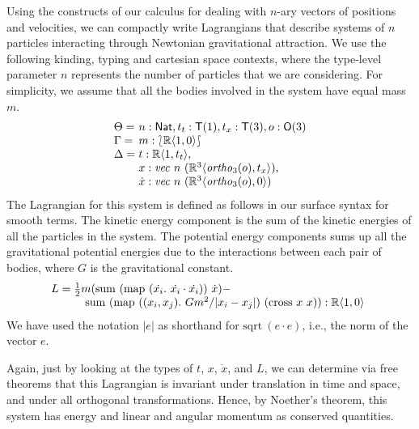 \documentclass{sigplanconf}
\newcommand{\typeOfCartSp}[1]{\lbag #1 \rbag}
\theoremstyle{examplestyle}
\begin{document}
Using the constructs of our calculus for dealing with $n$-ary vectors
of positions and velocities, we can compactly write Lagrangians that
describe systems of $n$ particles interacting through Newtonian
gravitational attraction. We use the following kinding, typing and
cartesian space contexts, where the type-level parameter $n$
represents the number of particles that we are considering. For
simplicity, we assume that all the bodies involved in the system have
equal mass $m$.
\begin{displaymath}
  \begin{array}{l@{\hspace{0.3em}}l}
    \Theta = & n : \mathsf{Nat}, t_t : \mathsf{T}(1), t_x : \mathsf{T}(3), o : \mathsf{O}(3) \\
    \Gamma = & m : \typeOfCartSp{\mathbb{R}\langle 1, 0 \rangle} \\
    \Delta = &
    \begin{array}[t]{@{}l}
      t : \mathbb{R}\langle 1, t_t \rangle, \\
      x : \mathit{vec}~n~(\mathbb{R}^3\langle \mathit{ortho}_3(o), t_x \rangle), \\
      \dot{x} : \mathit{vec}~n~(\mathbb{R}^3\langle \mathit{ortho}_3(o), 0 \rangle)
    \end{array}
  \end{array}
\end{displaymath}
The Lagrangian for this system is defined as follows in our surface
syntax for smooth terms. The kinetic energy component is the sum of
the kinetic energies of all the particles in the system. The potential
energy components sums up all the gravitational potential energies due
to the interactions between each pair of bodies, where $G$ is the
gravitational constant.
\begin{displaymath}
  L =
  \begin{array}[t]{@{}l}
    \frac{1}{2}m(\mathrm{sum}~(\mathrm{map}~(\dot{x_i}.~\dot{x_i}\cdot\dot{x_i}))~\dot{x}) - \\
    \quad \mathrm{sum}~(\mathrm{map}~((x_i,x_j).~Gm^2/|x_i - x_j|)~(\mathrm{cross}~x~x)) : \mathbb{R}\langle 1, 0 \rangle
  \end{array}
\end{displaymath}
We have used the notation $|e|$ as shorthand for $\mathrm{sqrt}~(e
\cdot e)$, i.e., the norm of the vector $e$.

Again, just by looking at the types of $t$, $x$, $\dot{x}$, and $L$,
we can determine via free theorems that this Lagrangian is invariant
under translation in time and space, and under all orthogonal
transformations. Hence, by Noether's theorem, this system has energy
and linear and angular momentum as conserved quantities.
\end{document}
